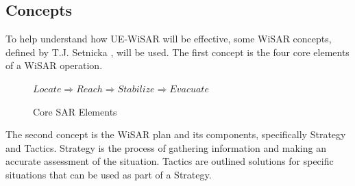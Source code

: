 \documentclass[12pt]{IEEEtran}
\begin{document}
\subsection{Concepts}

To help understand how UE-WiSAR will be effective, some WiSAR
concepts, defined by T.J. Setnicka \cite[p.~35]{setnicka1980}, will be used. 
The first concept is the four core elements of a WiSAR operation.
\begin{figure}[h]
	\begin{center}
		\begin{math}
			Locate \Rightarrow Reach \Rightarrow Stabilize \Rightarrow Evacuate
		\end{math}
	\end{center}
	\caption{Core SAR Elements}
\end{figure}

The second concept is the WiSAR plan and its components, specifically Strategy
and Tactics.  Strategy is the process of gathering information and making an
accurate assessment of the situation.  Tactics are outlined solutions for
specific situations that can be used as part of a Strategy.


\end{document}
